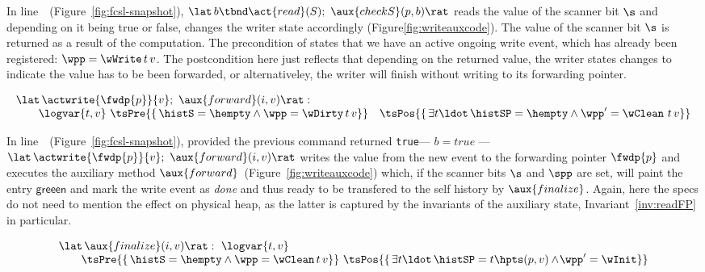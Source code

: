 In line~\lineWrtChk~(Figure~\ref{fig:fcsl-snapshot}), $ \lat\, b \tbnd
\act{read}(S);\ \aux{checkS}(p,b) \rat$ reads the value of the scanner
bit $\s$ and depending on it being true or false,  changes
the writer state accordingly (Figure\ref{fig:writeauxcode}). The value
of the scanner bit $\s$ is returned as a result of the
computation. The precondition of  states that we have an
active ongoing write event, which has already been registered: $ \wpp
= \wWrite\, t\, v $. The postcondition here just reflects that
depending on the returned value, the writer states changes to indicate
the value has to be been forwarded, or alternativeley, the writer will
finish without writing to its forwarding pointer.





\[
\begin{array}{l}
  \lat\, \actwrite{\fwdp{p}}{v};\ \aux{forward}(i,v)\rat :\\
  ~~~~~~ \logvar{t,v}\
  \tsPre{\{\, \histS = \hempty \wedge  \wpp = \wDirty\, t\, v\}}\quad 
  \tsPos{\{\, \exists t\ldot\, \histSP = \hempty \wedge
    \wpp' = \wClean\ t\, v \}}
\end{array}
\]



In line~\lineWrtFwd~(Figure~\ref{fig:fcsl-snapshot}), provided the
previous command returned {\tt true}--- \ie $b = true$ --- $ \lat\,
\actwrite{\fwdp{p}}{v};\ \aux{forward}(i,v)\rat $ writes the value
from the new event to the forwarding pointer $\fwdp{p}$ and executes
the auxiliary method $\aux{forward}$~(Figure~\ref{fig:writeauxcode})
which, if the scanner bits $\s$ and $\spp$ are set, will paint the
entry $\mathsf{greeen}$ and mark the write event as {\it done} and
thus ready to be transfered to the self history by
$\aux{finalize}$. Again, here the specs do not need to mention the
effect on physical heap, as the latter is captured by the invariants
of the auxiliary state, Invariant~\ref{inv:readFP} in particular.


\[
\begin{array}{l}
  \lat\,\aux{finalize}(i,v)\rat :\ \logvar{t,v}\\
  ~~~~~~ \tsPre{\{\, \histS = \hempty \wedge
    \wpp = \wClean\, t\, v \}}\
  \tsPos{\{\, \exists t\ldot\, \histSP = t \hpts (p,v) \wedge\!
    \wpp' = \wInit \}}
\end{array}
\]





